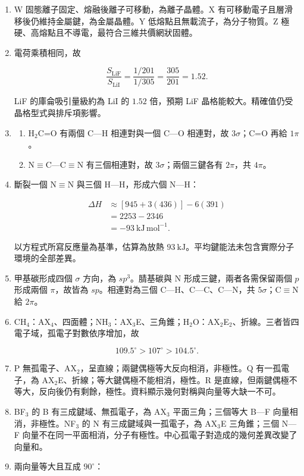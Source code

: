 \documentclass[11pt,a4paper]{article}
\providecommand{\tightlist}{%
  \setlength{\itemsep}{0pt}\setlength{\parskip}{0pt}}
\begin{document}
\begin{enumerate}
\def\labelenumi{\arabic{enumi}.}
\item
  W 固態離子固定、熔融後離子可移動，為離子晶體。X 有可移動電子且層滑移後仍維持金屬鍵，為金屬晶體。Y 低熔點且無載流子，為分子物質。Z 極硬、高熔點且不導電，最符合三維共價網狀固體。
\item
  電荷乘積相同，故

  \[
  \frac{S_{\mathrm{LiF}}}{S_{\mathrm{LiI}}}
  =\frac{1/201}{1/305}
  =\frac{305}{201}=1.52.
  \]

  LiF 的庫侖吸引量級約為 LiI 的 \(1.52\) 倍，預期 LiF 晶格能較大。精確值仍受晶格型式與排斥項影響。
\item
  \begin{enumerate}
  \def\labelenumii{\arabic{enumii}.}
  \tightlist
  \item
    H\(_2\)C=O 有兩個 C---H 相連對與一個 C---O 相連對，故 \(3\sigma\)；C=O 再給 \(1\pi\)。
  \item
    N\(\equiv\)C---C\(\equiv\)N 有三個相連對，故 \(3\sigma\)；兩個三鍵各有 \(2\pi\)，共 \(4\pi\)。
  \end{enumerate}
\item
  斷裂一個 N\(\equiv\)N 與三個 H---H，形成六個 N---H：

  \[
  \begin{aligned}
  \Delta H
  &\approx[945+3(436)]-6(391)\\
  &=2253-2346\\
  &=-93\ \mathrm{kJ\,mol^{-1}}.
  \end{aligned}
  \]

  以方程式所寫反應量為基準，估算為放熱 \(93\ \mathrm{kJ}\)。平均鍵能法未包含實際分子環境的全部差異。
\item
  甲基碳形成四個 \(\sigma\) 方向，為 \(sp^3\)。腈基碳與 N 形成三鍵，兩者各需保留兩個 \(p\) 形成兩個 \(\pi\)，故皆為 \(sp\)。相連對為三個 C---H、C---C、C---N，共 \(5\sigma\)；C\(\equiv\)N 給 \(2\pi\)。
\item
  CH\(_4\)：AX\(_4\)、四面體；NH\(_3\)：AX\(_3\)E、三角錐；H\(_2\)O：AX\(_2\)E\(_2\)、折線。三者皆四電子域，孤電子對數依序增加，故

  \[
  109.5^\circ>107^\circ>104.5^\circ.
  \]
\item
  P 無孤電子、AX\(_2\)，呈直線；兩鍵偶極等大反向相消，非極性。Q 有一孤電子，為 AX\(_2\)E、折線；等大鍵偶極不能相消，極性。R 是直線，但兩鍵偶極不等大，反向後仍有剩餘，極性。資料顯示幾何對稱與向量等大缺一不可。
\item
  BF\(_3\) 的 B 有三成鍵域、無孤電子，為 AX\(_3\) 平面三角；三個等大 B---F 向量相消，非極性。NF\(_3\) 的 N 有三成鍵域與一孤電子，為 AX\(_3\)E 三角錐；三個 N---F 向量不在同一平面相消，分子有極性。中心孤電子對造成的幾何差異改變了向量和。
\item
  兩向量等大且互成 \(90^\circ\)：


\end{enumerate}
\end{document}
